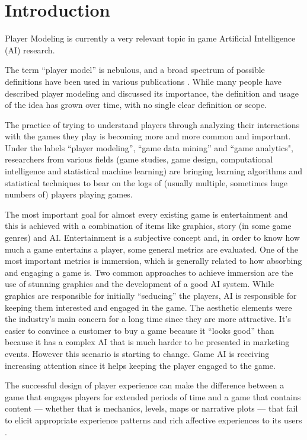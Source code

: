 \chapter{Introduction}
Player Modeling is currently a very relevant topic in game Artificial Intelligence (AI) research. 

The term “player model” is nebulous, and a broad spectrum of possible definitions have been used in various publications \citep{SmithInclusiveTaxonomyPlayer}. While many people have described player modeling and discussed its importance, the definition and usage of the idea has grown over time, with no single clear definition or scope.

The practice of trying to understand players through analyzing their interactions with the games they play is becoming more and more common and important. Under the labels “player modeling”, “game data mining” and “game analytics", researchers from various fields (game studies, game design, computational intelligence and statistical machine learning) are bringing learning algorithms and statistical techniques to bear on the logs of (usually multiple, sometimes huge numbers of) players playing games.

The most important goal for almost every existing game is entertainment \citep{NareyekAIComputerGames2004} and this is achieved with a combination of items like graphics, story (in some game genres) and AI.
Entertainment is a subjective concept and, in order to know how much a game entertains a player, some general metrics are evaluated. One of the most important metrics is immersion, which is generally related to how absorbing and engaging a game is. Two common approaches to achieve immersion are the use of stunning graphics and the development of a good AI system. While graphics are responsible for initially “seducing” the players, AI is responsible for keeping them interested and engaged in the game.
The aesthetic elements were the industry’s main concern for a long time since they are more attractive. It's easier to convince a customer to buy a game because it “looks good” than because it has a complex AI that is much harder to be presented in marketing events. However this scenario is starting to change. Game AI is receiving increasing attention since it helps keeping the player engaged to the game.

The successful design of player experience can make the difference between a game that engages players for extended periods of time and a game that contains content — whether that is mechanics, levels, maps or narrative plots — that fail to elicit appropriate experience patterns and rich affective experiences to its users \citep{YannakakisEmotionGames2011}.

